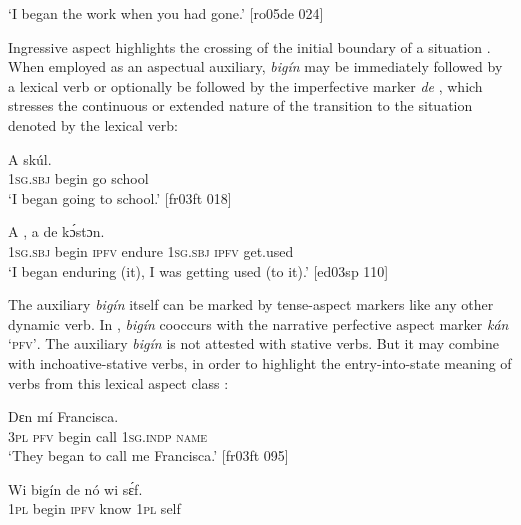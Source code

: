\glt ‘I began the work when you had gone.’ [ro05de 024]
\z

Ingressive aspect highlights the crossing of the initial boundary of a situation . When employed as an aspectual auxiliary, \textit{bigín} may be immediately followed by a lexical verb  or optionally be followed by the imperfective marker \textit{de} , which stresses the continuous or extended nature of the transition to the situation denoted by the lexical verb:


\ea%
    \label{ex:key:350}
    \gll \MakeUppercase{A}       skúl.\\
\textsc{1sg.sbj}  begin  go  school\\

\glt ‘I began going to school.’ [fr03ft 018]
\z


\ea%
    \label{ex:key:351}
    \gll A       ,    a    de  kɔ́stɔn.\\
\textsc{1sg.sbj}  begin  \textsc{ipfv}  endure  \textsc{1sg.sbj}  \textsc{ipfv}  get.used\\

\glt ‘I began enduring (it), I was getting used (to it).’ [ed03sp 110]
\z

The auxiliary \textit{bigín} itself can be marked by tense-aspect markers like any other dynamic verb. In , \textit{bigín} cooccurs with the narrative perfective aspect marker \textit{kán} ‘\textsc{pfv’}. The auxiliary \textit{bigín} is not attested with stative verbs. But it may combine with inchoative-stative verbs, in order to highlight the entry-into-state meaning of verbs from this lexical aspect class : 


\ea%
    \label{ex:key:352}
    \gll Dɛn        mí    Francisca.\\
\textsc{3pl}  \textsc{pfv}  begin  call  \textsc{1sg.indp}  \textsc{name}\\

\glt ‘They began to call me Francisca.’ [fr03ft 095]
\z


\ea%
    \label{ex:key:353}
    \gll Wi  bigín  de  nó    wi  sɛ́f.\\
\textsc{1pl}  begin  \textsc{ipfv}  know  \textsc{1pl}  self\\

